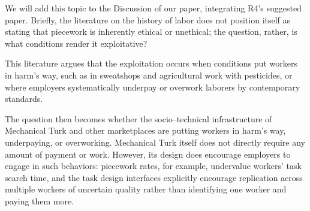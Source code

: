 \documentclass[11pt]{article}
\begin{document}
We will add this topic to the Discussion of our paper,
integrating R4's suggested~\citeauthor{williamson2016} paper.
Briefly, the literature on the history of labor does not
position itself as stating that piecework is inherently ethical or unethical;
the question, rather, is what conditions render it exploitative?

This literature argues that the exploitation occurs when
conditions put workers in harm's way, such as
in sweatshops and agricultural work with pesticides, or where
employers systematically underpay or overwork laborers by contemporary standards.

The question then becomes
whether the socio--technical infrastructure of Mechanical Turk
and other marketplaces
are putting workers in harm's way, underpaying, or overworking.
Mechanical Turk itself does not directly require any amount of payment or work.
However, its design does encourage employers to engage in such behaviors:
piecework rates, for example, undervalue workers' task search time, and
the task design interfaces explicitly encourage
replication across multiple workers of uncertain quality rather than
identifying one worker and paying them more.








\printbibliography{}
\end{document}
